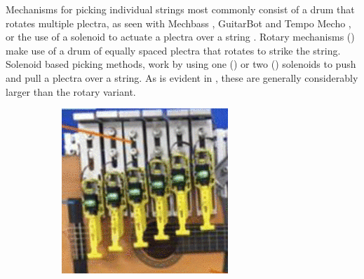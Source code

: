 \documentclass[12pt, a4paper, onecolumn]{IEEEtran}
\begin{document}
        
        Mechanisms for picking individual strings most commonly consist of a drum that rotates multiple plectra, as seen with Mechbass \cite{VUW_Chordophones}, GuitarBot \cite{GuitarBot} and Tempo Mecho \cite{barton_2019}, or the use of a solenoid to actuate a plectra over a string \cite{PWM_Solenoid,Silent_Picking,Pivot_Picking}. 
        Rotary mechanisms () make use of a drum of equally spaced plectra that rotates to strike the string.
        Solenoid based picking methods, work by using one () or two () solenoids to push and pull a plectra over a string.
        As is evident in , these are generally considerably larger than the rotary variant.
        
        \begin{figure}[!h]
            \centering
            \begin{subfigure}{0.2\textwidth}
                \includegraphics[width=\columnwidth]{silent_picking.png}
                \label{fig:silent_picking}
            \end{subfigure}
            \begin{subfigure}{0.3\textwidth}

\end{subfigure}
\end{figure}
\end{document}
